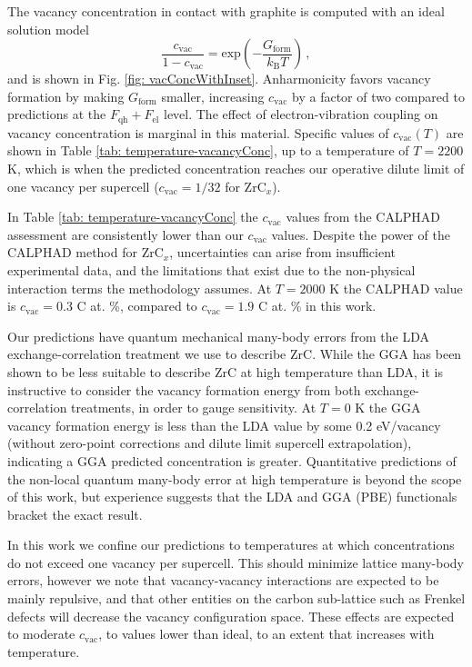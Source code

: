 \documentclass[twocolumn,american,aps,prb,showpacs,showkeys,amsmath,amssymb,superscriptaddress,a4]{revtex4-1}
\begin{document}
The vacancy concentration in contact with graphite is computed with an ideal solution model 
\begin{equation}
\frac{c_{\text{vac}}}{1-c_{\text{vac}}}=\text{exp}\left(-\frac{G_{\text{form}}}{k_\text{B} T}\right)\,,
\label{eq: cVac}
\end{equation}
and is shown in Fig. \ref{fig: vacConcWithInset}. Anharmonicity favors
vacancy formation by making $G_{\text{form}}^{\text{}}$ smaller, increasing
$c_{\text{vac}}$ by a factor of two compared to predictions
at the $F_{\text{qh}}+F_{\text{el}}$ level. The effect of electron-vibration coupling on vacancy concentration is marginal in this material. Specific values of $c_{\text{vac}}(T)$
are shown in Table \ref{tab: temperature-vacancyConc}, up to a temperature of $T=2200$
K, which is when the predicted concentration reaches our operative dilute
limit of one vacancy per supercell ($c_{\text{vac}}=1/32$ for ZrC$_x$).

In Table \ref{tab: temperature-vacancyConc} the $c_{\text{vac}}$
values from the CALPHAD assessment are consistently
lower than our $c_{\text{vac}}$ values. \cite{FernandezGuillermet1995}
Despite the power of the CALPHAD method for ZrC$_x$,\cite{FernandezGuillermet1995}
uncertainties can arise from insufficient experimental data, and the
limitations that exist due to the non-physical interaction terms the
methodology assumes. 
At $T=2000$ K the CALPHAD value is $c_{\text{vac}}=0.3$ C at. \%,\cite{FernandezGuillermet1995}
compared to $c_{\text{vac}}=1.9$ C at. \% in this work.

Our predictions have quantum mechanical many-body errors from the
LDA exchange-correlation treatment we use to describe ZrC. While the GGA
has been shown to be less suitable to describe ZrC at high temperature
than LDA,\cite{Duff2015}  it is instructive to consider the vacancy
formation energy from both exchange-correlation treatments, in order to gauge sensitivity. At $T=0$ K the GGA vacancy formation energy is less than the LDA value by some
0.2 eV/vacancy (without zero-point corrections and dilute limit supercell
extrapolation), indicating a GGA predicted concentration is greater.
Quantitative predictions of the non-local quantum many-body error
at high temperature is beyond the scope of this work, but experience suggests that the LDA and GGA (PBE) functionals bracket the exact result.\citep{Grabowski2015}

In this work we confine our predictions to temperatures at which concentrations
do not exceed one vacancy per supercell. This should minimize lattice
many-body errors, however we note that vacancy-vacancy interactions
are expected to be mainly repulsive,\cite{Zhang2015} and that other
entities on the carbon sub-lattice such as Frenkel defects will decrease the vacancy configuration
space.\cite{Mellan2018} These effects are expected to moderate $c_{\text{vac}}$, to values lower than ideal,
to an extent that increases with temperature. 
\end{document}
